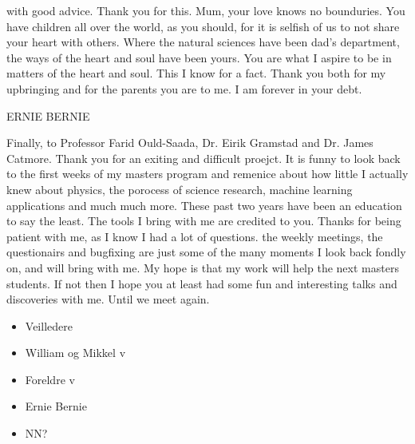 with good advice. Thank you for this. Mum, your love knows no bounduries. You have children all over the world, as you should, 
for it is selfish of us to not share your heart with others. Where the natural sciences have been dad's department, the ways 
of the heart and soul have been yours. You are what I aspire to be in matters of the heart and soul. This I know for a fact. 
Thank you both for my upbringing and for the parents you are to me. I am forever in your debt. \par 
ERNIE BERNIE\par
Finally, to Professor Farid Ould-Saada, Dr. Eirik Gramstad and Dr. James Catmore. Thank you for an exiting and difficult proejct. 
It is funny to look back to the first weeks of my masters program and remenice about how little I actually knew about physics, 
the porocess of science research, machine learning applications and much much more. These past two years have been an education 
to say the least. The tools I bring with me are credited to you. Thanks for being patient with me, as I know I had a lot of questions. 
the weekly meetings, the questionairs and bugfixing are just some of the many moments I look back fondly on, and will bring with me. 
My hope is that my work will help the next masters students. If not then I hope you at least had some fun and interesting talks 
and discoveries with me. Until we meet again. 



\begin{itemize}
\item Veilledere 
\item William og Mikkel v
\item Foreldre v
\item Ernie Bernie  
\item NN?

\end{itemize}